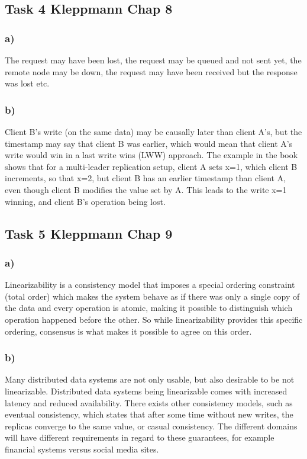 \documentclass[12pt, titlepage]{report}
\begin{document}
\subsection*{Task 4 Kleppmann Chap 8}
\subsubsection{a)}
The request may have been lost, the request may be queued and not sent yet, the remote node may be down, the request may have been received but the response was lost etc.
\subsubsection{b)}
Client B's write (on the same data) may be causally later than client A's, but the timestamp may say that client B was earlier, which would mean that client A's write would win in a last write wins (LWW) approach. The example in the book shows that for a multi-leader replication setup, client A sets x=1, which client B increments, so that x=2, but client B has an earlier timestamp than client A, even though client B modifies the value set by A. This leads to the write x=1 winning, and client B's operation being lost.
\subsection*{Task 5 Kleppmann Chap 9}
\subsubsection{a)}
Linearizability is a consistency model that imposes a special ordering constraint (total order) which makes the system behave as if there was only a single copy of the data and every operation is atomic, making it possible to distinguish which operation happened before the other. So while linearizability provides this specific ordering, consensus is what makes it possible to agree on this order.
\subsubsection{b)}
Many distributed data systems are not only usable, but also desirable to be not linearizable. Distributed data systems being linearizable comes with increased latency and reduced availability. There exists other consistency models, such as eventual consistency, which states that after some time without new writes, the replicas converge to the same value, or casual consistency. The different domains will have different requirements in regard to these guarantees, for example financial systems versus social media sites.
\end{document}
